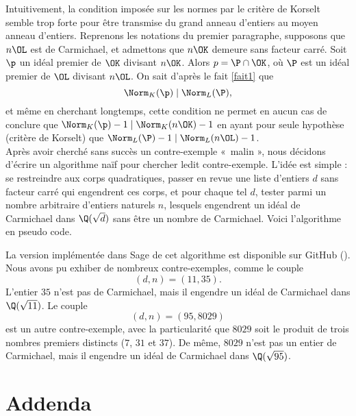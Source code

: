 \documentclass[a4paper, 12pt, oneside]{article}
\begin{document}
Intuitivement, la condition imposée sur les normes par le critère de Korselt semble trop forte pour être transmise du grand anneau d'entiers au moyen anneau d'entiers. Reprenons les notations du premier paragraphe, supposons que $n\OL$ est de Carmichael, et admettons que $n\OK$ demeure sans facteur carré. Soit $\p$ un idéal premier de $\OK$ divisant $n\OK$. Alors $p=\P\cap \OK$, où $\P$ est un idéal premier de $\OL$ divisant $n\OL$. On sait d'après le fait \ref{fait1} que $$\Norm_K(\p) \mid \Norm_L(\P),$$ et même en cherchant longtemps, cette condition ne permet en aucun cas de conclure que $\Norm_K(\p) - 1\mid \Norm_K(n\OK) - 1$ en ayant pour seule hypothèse (critère de Korselt) que $\Norm_L(\P) - 1 \mid \Norm_L(n\OL) - 1$. \\

Après avoir cherché sans succès un contre-exemple « malin », nous décidons d'écrire un algorithme naïf pour chercher ledit contre-exemple. L'idée est simple : se restreindre aux corps quadratiques, passer en revue une liste d'entiers $d$ sans facteur carré qui engendrent ces corps, et pour chaque tel $d$, tester parmi un nombre arbitraire d'entiers naturels $n$, lesquels engendrent un idéal de Carmichael dans $\Q(\sqrt{d})$ sans être un nombre de Carmichael. Voici l'algorithme en pseudo code. \\

\begin{algorithm}[H]
\end{algorithm}

\vspace{1em}
La version implémentée dans Sage de cet algorithme est disponible sur GitHub (). Nous avons pu exhiber de nombreux contre-exemples, comme le couple $$(d, n) = (11, 35).$$ L'entier $35$ n'est pas de Carmichael, mais il engendre un idéal de Carmichael dans $\Q(\sqrt{11})$. Le couple $$(d, n) = (95,8029)$$ est un autre contre-exemple, avec la particularité que $8029$ soit le produit de trois nombres premiers distincts ($7$, $31$ et $37$). De même, $8029$ n'est pas un entier de Carmichael, mais il engendre un idéal de Carmichael dans $\Q(\sqrt{95})$.

\section{Addenda}
\end{document}
